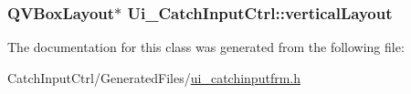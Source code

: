 \label{class_ui___catch_input_ctrl_a400cc2815d260b0d5a2002e0f3930624}
\hypertarget{class_ui___catch_input_ctrl_a9561b6529376d26e0ccb20cc6c14b250}{
\subsubsection[{verticalLayout}]{\setlength{\rightskip}{0pt plus 5cm}QVBoxLayout$\ast$ {\bf Ui\_\-CatchInputCtrl::verticalLayout}}}
\label{class_ui___catch_input_ctrl_a9561b6529376d26e0ccb20cc6c14b250}


The documentation for this class was generated from the following file:\begin{DoxyCompactItemize}
\item 
CatchInputCtrl/GeneratedFiles/\hyperlink{ui__catchinputfrm_8h}{ui\_\-catchinputfrm.h}\end{DoxyCompactItemize}

